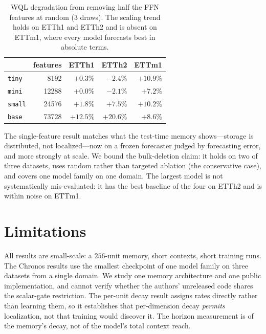 \documentclass{article}
\begin{document}
\begin{table}[h]
\centering
\caption{WQL degradation from removing half the FFN features at random (3 draws). The
scaling trend holds on ETTh1 and ETTh2 and is absent on ETTm1, where every model forecasts
best in absolute terms.}
\label{tab:chronos}
\small
\begin{tabular}{lrrrr}
\toprule
& features & ETTh1 & ETTh2 & ETTm1 \\
\midrule
\texttt{tiny}  &  8192 & $+0.3\%$ & $-2.4\%$ & $+10.9\%$ \\
\texttt{mini}  & 12288 & $+0.0\%$ & $-2.1\%$ & $+7.2\%$ \\
\texttt{small} & 24576 & $+1.8\%$ & $+7.5\%$ & $+10.2\%$ \\
\texttt{base}  & 73728 & $+12.5\%$ & $+20.6\%$ & $+8.6\%$ \\
\bottomrule
\end{tabular}
\end{table}

The single-feature result matches what the test-time memory shows---storage is distributed,
not localized---now on a frozen forecaster judged by forecasting error, and more strongly at
scale. We bound the bulk-deletion claim: it holds on two of three datasets, uses random
rather than targeted ablation (the conservative case), and covers one model family on one
domain. The largest model is not systematically mis-evaluated: it has the best baseline of
the four on ETTh2 and is within noise on ETTm1.

\section{Limitations}

All results are small-scale: a $256$-unit memory, short contexts, short training
runs. The Chronos results use the smallest checkpoint of one model family on three datasets from a single domain. We study one memory architecture and one public implementation, and cannot verify
whether the authors' unreleased code shares the scalar-gate restriction. The
per-unit decay result assigns rates directly rather than learning them, so it
establishes that per-dimension decay \emph{permits} localization, not that
training would discover it. The horizon measurement is of the memory's decay,
not of the model's total context reach.
\end{document}

